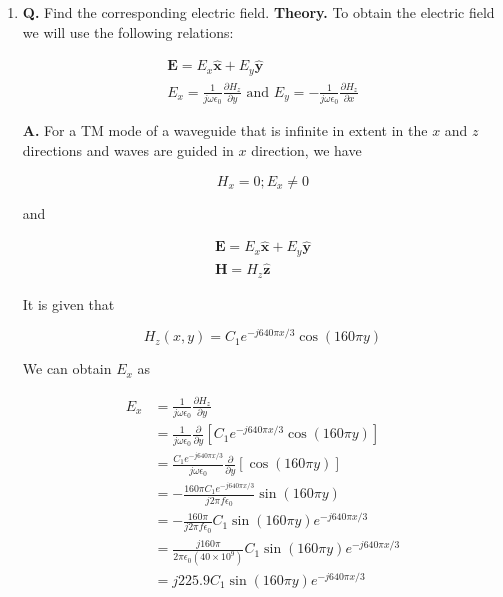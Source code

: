 \documentclass[main.tex]{subfiles}
\begin{document}
\begin{enumerate}
\begin{enumerate}
        \item \textbf{Q.} Find the corresponding electric field. \textbf{Theory.} To obtain the electric field we will use the following relations:
        
        $$
        \begin{gathered}
        \mathbf{E}=E_x \hat{\mathbf{x}}+E_y \hat{\mathbf{y}} \\
        E_x=\frac{1}{j \omega \epsilon_0} \frac{\partial H_z}{\partial y} \text { and } E_y=-\frac{1}{j \omega \epsilon_0} \frac{\partial H_z}{\partial x}
        \end{gathered}
        $$ 
        
        \textbf{A.} For a TM mode of a waveguide that is infinite in extent in the $x$ and $z$ directions and waves are guided in $x$ direction, we have
        
        $$
        H_x=0 ; E_x \neq 0
        $$
        
        and
        
        $$
        \begin{gathered}
        \mathbf{E}=E_x \hat{\mathbf{x}}+E_y \hat{\mathbf{y}} \\
        \mathbf{H}=H_z \hat{\mathbf{z}}
        \end{gathered}
        $$
        
        It is given that
        
        $$
        H_z(x, y)=C_1 e^{-j 640 \pi x / 3} \cos (160 \pi y)
        $$

        We can obtain $E_x$ as
        
        $$
        \begin{aligned}
        E_x & =\frac{1}{j \omega \epsilon_0} \frac{\partial H_z}{\partial y} \\
        & =\frac{1}{j \omega \epsilon_0} \frac{\partial}{\partial y}\left[C_1 e^{-j 640 \pi x / 3} \cos (160 \pi y)\right] \\
        & =\frac{C_1 e^{-j 640 \pi x / 3}}{j \omega \epsilon_0} \frac{\partial}{\partial y}[\cos (160 \pi y)] \\
        & =-\frac{160 \pi C_1 e^{-j 640 \pi x / 3}}{j 2 \pi f \epsilon_0} \sin (160 \pi y) \\
        & =-\frac{160 \pi}{j 2 \pi f \epsilon_0} C_1 \sin (160 \pi y) e^{-j 640 \pi x / 3} \\
        & =\frac{j 160 \pi}{2 \pi \epsilon_0\left(40 \times 10^9\right)} C_1 \sin (160 \pi y) e^{-j 640 \pi x / 3} \\
        & =j 225.9 C_1 \sin (160 \pi y) e^{-j 640 \pi x / 3}
        \end{aligned}
        $$


\end{enumerate}
\end{enumerate}
\end{document}

